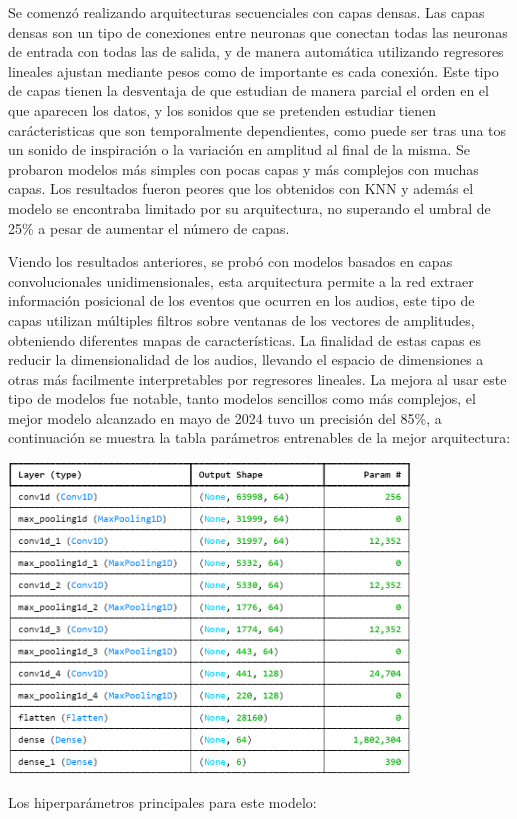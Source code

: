 Se comenzó realizando arquitecturas secuenciales con capas densas. Las capas densas son un tipo de conexiones entre neuronas que conectan todas las neuronas de entrada con todas las de salida, y de manera automática utilizando regresores lineales ajustan mediante pesos como de importante es cada conexión. Este tipo de capas tienen la desventaja de que estudian de manera parcial el orden en el que aparecen los datos, y los sonidos que se pretenden estudiar tienen carácteristicas que son temporalmente dependientes, como puede ser tras una tos un sonido de inspiración o la variación en amplitud al final de la misma. Se probaron modelos más simples con pocas capas y más complejos con muchas capas. Los resultados fueron peores que los obtenidos con KNN y además el modelo se encontraba limitado por su arquitectura, no superando el umbral de 25\% a pesar de aumentar el número de capas.

Viendo los resultados anteriores, se probó con modelos basados en capas convolucionales unidimensionales, esta arquitectura permite a la red extraer información posicional de los eventos que ocurren en los audios, este tipo de capas utilizan múltiples filtros sobre ventanas de los vectores de amplitudes, obteniendo diferentes mapas de características. La finalidad de estas capas es reducir la dimensionalidad de los audios, llevando el espacio de dimensiones a otras más facilmente interpretables por regresores lineales.
La mejora al usar este tipo de modelos fue notable, tanto modelos sencillos como más complejos, el mejor modelo alcanzado en mayo de 2024 tuvo un precisión del 85\%, a continuación se muestra la tabla parámetros entrenables de la mejor arquitectura:
\begin{center}
    \includegraphics[width=0.8\textwidth]{ImagenesLatex/Conv1D_capas.PNG}
\end{center}
Los hiperparámetros principales para este modelo:


